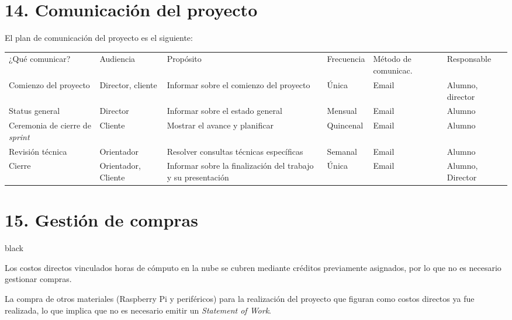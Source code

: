 \documentclass[11pt]{charter}
\begin{document}
\section{14. Comunicación del proyecto}
\label{sec:comunicaciones}

El plan de comunicación del proyecto es el siguiente:

\begin{table}[htpb]
\centering
\begin{tabularx}{\linewidth}{@{}|X|C{2.4cm}|C{3cm}|C{1.8cm}|C{2cm}|C{2.1cm}|@{}}
\hline
{} 
           \\ \hline
{} 
¿Qué comunicar? & Audiencia & Propósito & Frecuencia & Método de comunicac. & Responsable \\ \hline
Comienzo del proyecto & Director, cliente & Informar sobre el comienzo del proyecto & Única & Email & Alumno, director \\ \hline
Status general & Director & Informar sobre el estado general & Mensual & Email & Alumno  \\ \hline
Ceremonia de cierre de \textit{sprint} & Cliente & Mostrar el avance y planificar & Quincenal  & Email & Alumno  \\ \hline
Revisión técnica & Orientador  & Resolver consultas técnicas específicas & Semanal & Email &  Alumno \\ \hline
Cierre & Orientador, Cliente & Informar sobre la finalización del trabajo y su presentación & Única  & Email & Alumno, Director  \\ \hline
\end{tabularx}
\end{table}

\section{15. Gestión de compras}
\label{sec:compras}

\begin{consigna}{black}

Los costos directos vinculados horas de cómputo en la nube se cubren mediante créditos previamente asignados, por lo que no es necesario gestionar compras.

La compra de otros materiales (Raspberry Pi y periféricos) para la realización del proyecto que figuran como costos directos ya fue realizada, lo que implica que no es necesario emitir un \textit{Statement of Work}.

\end{consigna}
\end{document}
